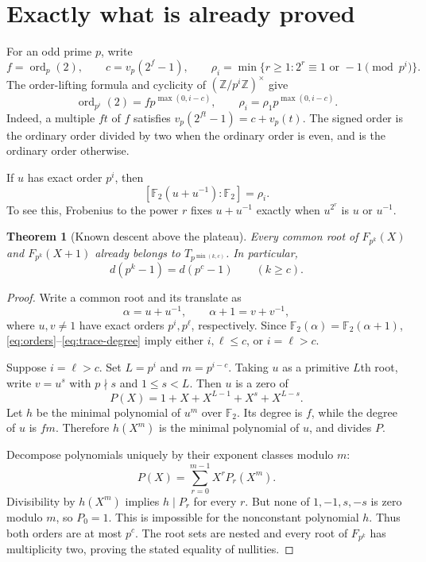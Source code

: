 \documentclass[a4paper]{article}
\newtheorem{theorem}{Theorem}[section]
\newcommand{\F}{\mathbb F}
\newcommand{\Z}{\mathbb Z}
\newcommand{\ord}{\operatorname{ord}}
\begin{document}
\section{Exactly what is already proved}\label{sec:descent}

For an odd prime $p$, write
\[
 f=\ord_p(2),\qquad c=v_p(2^f-1),\qquad
 \rho_i=\min\{r\geq1:2^r\equiv1\text{ or }-1\pmod{p^i}\}.
\]
The order-lifting formula and cyclicity of
$(\Z/p^i\Z)^\times$ give
\begin{equation}\label{eq:orders}
 \ord_{p^i}(2)=f p^{\max(0,i-c)},\qquad
 \rho_i=\rho_1p^{\max(0,i-c)}.
\end{equation}
Indeed, a multiple $ft$ of $f$ satisfies
$v_p(2^{ft}-1)=c+v_p(t)$.
The signed order is the ordinary order divided by two when the
ordinary order is even, and is the ordinary order otherwise.

If $u$ has exact order $p^i$, then
\begin{equation}\label{eq:trace-degree}
 [\F_2(u+u^{-1}):\F_2]=\rho_i.
\end{equation}
To see this, Frobenius to the power $r$ fixes $u+u^{-1}$ exactly when
$u^{2^r}$ is $u$ or $u^{-1}$.

\begin{theorem}[Known descent above the plateau]\label{thm:descent}
Every common root of $F_{p^k}(X)$ and $F_{p^k}(X+1)$ already belongs
to $T_{p^{\min(k,c)}}$.  In particular,
\[
 d(p^k-1)=d(p^c-1)\qquad(k\geq c).
\]
\end{theorem}

\begin{proof}
Write a common root and its translate as
\[
 \alpha=u+u^{-1},\qquad \alpha+1=v+v^{-1},
\]
where $u,v\ne1$ have exact orders $p^i,p^\ell$, respectively.
Since $\F_2(\alpha)=\F_2(\alpha+1)$,
\eqref{eq:orders}--\eqref{eq:trace-degree} imply either
$i,\ell\leq c$, or $i=\ell>c$.

Suppose $i=\ell>c$.  Set $L=p^i$ and $m=p^{i-c}$.
Taking $u$ as a primitive $L$th root, write $v=u^s$ with $p\nmid s$
and $1\leq s<L$.  Then $u$ is a zero of
\[
 P(X)=1+X+X^{L-1}+X^s+X^{L-s}.
\]
Let $h$ be the minimal polynomial of $u^m$ over $\F_2$.
Its degree is $f$, while the degree of $u$ is $fm$.
Therefore $h(X^m)$ is the minimal polynomial of $u$, and divides $P$.

Decompose polynomials uniquely by their exponent classes modulo $m$:
\[
 P(X)=\sum_{r=0}^{m-1}X^rP_r(X^m).
\]
Divisibility by $h(X^m)$ implies $h\mid P_r$ for every $r$.
But none of $1,-1,s,-s$ is zero modulo $m$, so $P_0=1$.
This is impossible for the nonconstant polynomial $h$.
Thus both orders are at most $p^c$.
The root sets are nested and every root of $F_{p^k}$ has multiplicity
two, proving the stated equality of nullities.
\end{proof}
\end{document}

